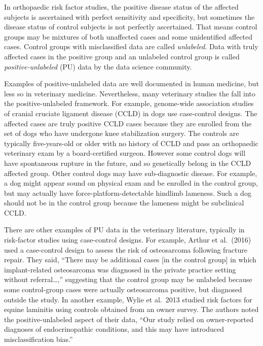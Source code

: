 \documentclass[
]{article}
\begin{document}
In orthopaedic risk factor studies, the positive disease status of the
affected subjects is ascertained with perfect sensitivity and
specificity, but sometimes the disease status of control subjects is not
perfectly ascertained. That means control groups may be mixtures of both
unaffected cases and some unidentified affected cases. Control groups
with misclassified data are called \emph{unlabeled}. Data with truly
affected cases in the positive group and an unlabeled control group is
called \emph{positive-unlabeled} (PU) data by the data science
community.

Examples of positive-unlabeled data are well documented in human
medicine, but less so in veterinary medicine. Nevertheless, many
veterinary studies the fall into the positive-unlabeled framework. For
example, genome-wide association studies of cranial cruciate ligament
disease (CCLD) in dogs use case-control designs. The affected cases are
truly positive CCLD cases because they are enrolled from the set of dogs
who have undergone knee stabilization surgery. The controls are
typically five-years-old or older with no history of CCLD and pass an
orthopaedic veterinary exam by a board-certified surgeon. However some
control dogs will have spontaneous rupture in the future, and so
genetically belong in the CCLD affected group. Other control dogs may
have sub-diagnostic disease. For example, a dog might appear sound on
physical exam and be enrolled in the control group, but may actually
have force-platform-detectable hindlimb lameness. Such a dog should not
be in the control group because the lameness might be subclinical CCLD.
\cite{wrehim08}

There are other examples of PU data in the veterinary literature,
typically in risk-factor studies using case-control designs. For
example, Arthur et al.~(2016) used a case-control design to assess the
risk of osteosarcoma following fracture repair. \cite{aakj16} They said,
``There may be additional cases {[}in the control group{]} in which
implant-related osteosarcoma was diagnosed in the private practice
setting without referral\ldots,'' suggesting that the control group may
be unlabeled because some control-group cases were actually osteosarcoma
positive, but diagnosed outside the study. In another example, Wylie et
al.~2013 studied risk factors for equine laminitis using controls
obtained from an owner survey.\cite{wcvj13} The authors noted the
positive-unlabeled aspect of their data, ``Our study relied on
owner-reported diagnoses of endocrinopathic conditions, and this may
have introduced misclassification bias.''
\end{document}

